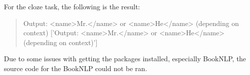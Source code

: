 \documentclass[12pt]{article}
\begin{document}
    \noindent
    For the cloze task, the following is the result:
    \begin{quotation}
        Output: <name>Mr.</name> or <name>He</name> (depending on context) ['Output:
        <name>Mr.</name> or <name>He</name> (depending on context)']
    \end{quotation}

    Due to some issues with getting the packages installed, especially BookNLP, the
    source code for the BookNLP could not be ran.

    \newpage
    
\end{document}
